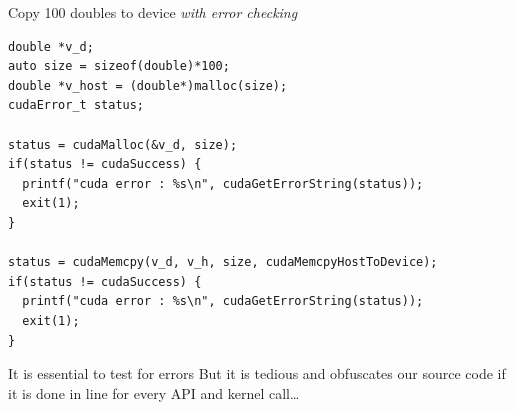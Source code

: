 \documentclass[aspectratio=43]{beamer}
\begin{document}
\begin{frame}[fragile]{}

    \begin{code}{Copy 100 doubles to device \emph{with error checking}}
        \begin{lstlisting}[style=boxcudatiny]
double *v_d;
auto size = sizeof(double)*100;
double *v_host = (double*)malloc(size);
cudaError_t status;

status = cudaMalloc(&v_d, size);
if(status != cudaSuccess) {
  printf("cuda error : %s\n", cudaGetErrorString(status));
  exit(1);
}

status = cudaMemcpy(v_d, v_h, size, cudaMemcpyHostToDevice);
if(status != cudaSuccess) {
  printf("cuda error : %s\n", cudaGetErrorString(status));
  exit(1);
}
        \end{lstlisting}
    \end{code}

    \begin{info}{It is essential to test for errors}
        But it is tedious and obfuscates our source code if it is done in line for every API and kernel call\ldots
    \end{info}
\end{frame}
\end{document}
